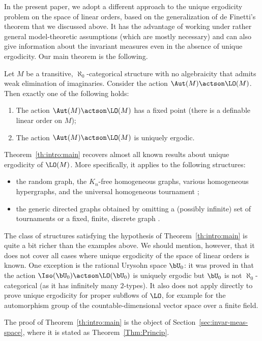 In the present paper, we adopt a different approach to the unique ergodicity problem on the space of linear orders, based on the generalization of de Finetti's theorem that we discussed above. It has the advantage of working under rather general model-theoretic assumptions (which are mostly necessary) and can also give information about the invariant measures even in the absence of unique ergodicity. Our main theorem is the following.
\begin{theorem}
\label{th:intro:main} Let $M$ be a transitive, $\aleph_0$-categorical structure with no algebraicity that admits weak elimination of imaginaries. Consider the action $\Aut(M) \actson \LO(M)$. Then exactly one of the following holds:
\begin{enumerate}
\item The action $\Aut(M) \actson \LO(M)$ has a fixed point (\ie there is a definable linear order on $M$);
\item The action $\Aut(M) \actson \LO(M)$ is uniquely ergodic.
\end{enumerate}
\end{theorem}
Theorem~\ref{th:intro:main} recovers almost all known results about unique ergodicity of $\LO(M)$. More specifically, it applies to the following structures:
\begin{itemize}
\item the random graph, the $K_n$-free homogeneous graphs, various homogeneous hypergraphs, and the universal homogeneous tournament \cite{Angel2014};

\item the generic directed graphs obtained by omitting a (possibly infinite) set of tournaments or a fixed, finite, discrete graph \cite{Pawliuk2020}.
\end{itemize}
The class of structures satisfying the hypothesis of Theorem~\ref{th:intro:main} is quite a bit richer than the examples above. We should mention, however, that it does not cover all cases where unique ergodicity of the space of linear orders is known. One exception is the rational Urysohn space $\bU_0$: it was proved in \cite{Angel2014} that the action $\Iso(\bU_0) \actson\nobreak \LO(\bU_0)$ is uniquely ergodic but $\bU_0$ is not $\aleph_0$-categorical (as it has infinitely many $2$-types). It also does not apply directly to prove unique ergodicity for proper subflows of $\LO$, for example for the automorphism group of the countable-dimensional vector space over a finite field.

The proof of Theorem~\ref{th:intro:main} is the object of Section~\ref{sec:invar-meas-space}, where it is stated as Theorem~\ref{Thm:Princip}.

